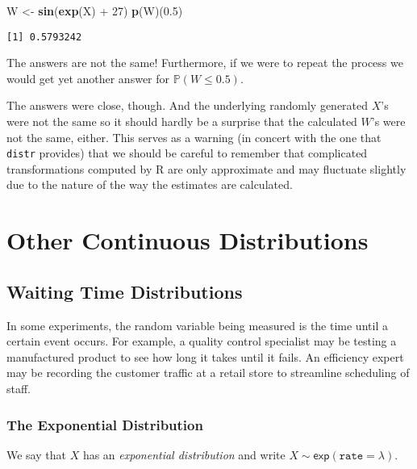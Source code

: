 \documentclass[]{book}
\newenvironment{Shaded}{\begin{snugshade}}{\end{snugshade}}
\newcommand{\KeywordTok}[1]{\textcolor[rgb]{0.13,0.29,0.53}{\textbf{{#1}}}}
\newcommand{\DecValTok}[1]{\textcolor[rgb]{0.00,0.00,0.81}{{#1}}}
\newcommand{\FloatTok}[1]{\textcolor[rgb]{0.00,0.00,0.81}{{#1}}}
\newcommand{\StringTok}[1]{\textcolor[rgb]{0.31,0.60,0.02}{{#1}}}
\newcommand{\NormalTok}[1]{{#1}}
\numberwithin{equation}{chapter}
\numberwithin{figure}{chapter}
\theoremstyle{plain}
\theoremstyle{definition}
\theoremstyle{remark}
\theoremstyle{definition}
\theoremstyle{definition}
\theoremstyle{remark}
\begin{document}
\begin{Shaded}
\begin{Highlighting}[]
\NormalTok{W <-}\StringTok{ }\KeywordTok{sin}\NormalTok{(}\KeywordTok{exp}\NormalTok{(X) +}\StringTok{ }\DecValTok{27}\NormalTok{)}
\KeywordTok{p}\NormalTok{(W)(}\FloatTok{0.5}\NormalTok{)}
\end{Highlighting}
\end{Shaded}

\begin{verbatim}
[1] 0.5793242
\end{verbatim}

The answers are not the same! Furthermore, if we were to repeat the
process we would get yet another answer for \(\mathbb{P}(W\leq0.5)\).

The answers were close, though. And the underlying randomly generated
\(X\)'s were not the same so it should hardly be a surprise that the
calculated \(W\)'s were not the same, either. This serves as a warning
(in concert with the one that \texttt{distr} provides) that we should be
careful to remember that complicated transformations computed by R are
only approximate and may fluctuate slightly due to the nature of the way
the estimates are calculated.

\section{Other Continuous
Distributions}\label{sec-other-continuous-distributions}

\subsection{Waiting Time
Distributions}\label{sub-waiting-time-distributions}

In some experiments, the random variable being measured is the time
until a certain event occurs. For example, a quality control specialist
may be testing a manufactured product to see how long it takes until it
fails. An efficiency expert may be recording the customer traffic at a
retail store to streamline scheduling of staff.

\subsubsection{The Exponential
Distribution}\label{sub-the-exponential-distribution}

We say that \(X\) has an \emph{exponential distribution} and write
\(X\sim\mathsf{exp}(\mathtt{rate}=\lambda)\).
\end{document}
